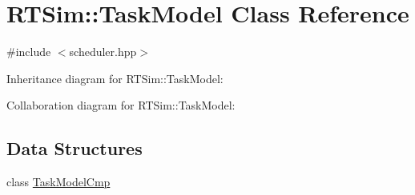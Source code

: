 \hypertarget{classRTSim_1_1TaskModel}{}\section{R\+T\+Sim\+:\+:Task\+Model Class Reference}
\label{classRTSim_1_1TaskModel}


{\ttfamily \#include $<$scheduler.\+hpp$>$}



Inheritance diagram for R\+T\+Sim\+:\+:Task\+Model\+:


Collaboration diagram for R\+T\+Sim\+:\+:Task\+Model\+:
\subsection*{Data Structures}
\begin{DoxyCompactItemize}
\item 
class \hyperlink{classRTSim_1_1TaskModel_1_1TaskModelCmp}{Task\+Model\+Cmp}
\end{DoxyCompactItemize}
